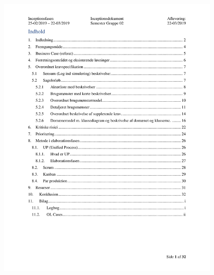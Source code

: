 \begin{figure}[hb]
  \includegraphics[width=\linewidth]{./PNG/Inceptions/Gruppe02+InceptionsDokument-02.jpg} 
\end{figure}

